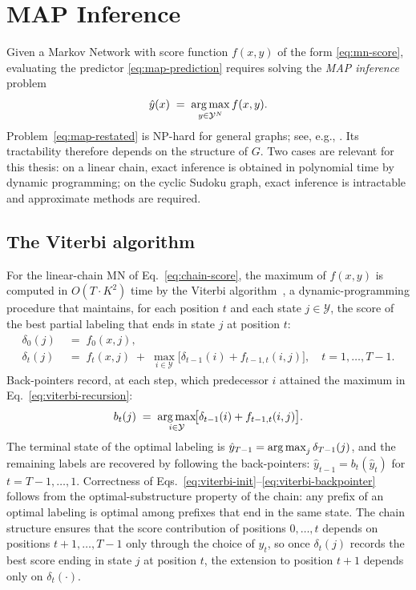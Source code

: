 \section{MAP Inference}
\label{sec:map-inference}

Given a Markov Network with score function $f(x, y)$ of the form
\eqref{eq:mn-score}, evaluating the predictor
\eqref{eq:map-prediction} requires solving the \emph{MAP inference}
problem
\begin{equation}
    \hat{y}(x) \;=\; \operatorname*{arg\,max}_{y \in \mathcal{Y}^{N}} f(x, y).
    \label{eq:map-restated}
\end{equation}
Problem~\eqref{eq:map-restated} is NP-hard for general graphs; see,
e.g., \cite{Shimony1994}. Its tractability therefore depends on the
structure of $G$. Two cases are relevant for this thesis: on a linear
chain, exact inference is obtained in polynomial time by dynamic
programming; on the cyclic Sudoku graph, exact inference is
intractable and approximate methods are required.

\subsection{The Viterbi algorithm}
\label{subsec:viterbi}

For the linear-chain MN of Eq.~\eqref{eq:chain-score}, the maximum of
$f(x, y)$ is computed in $O(T \cdot K^2)$ time by the Viterbi
algorithm~\cite{Viterbi1967, Forney1973}, a dynamic-programming
procedure that maintains, for each position $t$ and each state
$j \in \mathcal{Y}$, the score of the best partial labeling that ends
in state $j$ at position $t$:
\begin{align}
    \delta_0(j) &\;=\; f_0(x, j),
    \label{eq:viterbi-init} \\
    \delta_t(j) &\;=\; f_t(x, j)
    \;+\; \max_{i \in \mathcal{Y}}\!\bigl[
        \delta_{t-1}(i) + f_{t-1, t}(i, j)
    \bigr], \quad t = 1, \ldots, T-1.
    \label{eq:viterbi-recursion}
\end{align}
Back-pointers record, at each step, which predecessor $i$ attained
the maximum in Eq.~\eqref{eq:viterbi-recursion}:
\begin{equation}
    b_t(j) \;=\; \operatorname*{arg\,max}_{i \in \mathcal{Y}}\!\bigl[
        \delta_{t-1}(i) + f_{t-1, t}(i, j)
    \bigr].
    \label{eq:viterbi-backpointer}
\end{equation}
The terminal state of the optimal labeling is
$\hat{y}_{T-1} = \operatorname*{arg\,max}_j \delta_{T-1}(j)$, and the remaining
labels are recovered by following the back-pointers:
$\hat{y}_{t-1} = b_t(\hat{y}_t)$ for $t = T-1, \ldots, 1$.
Correctness of Eqs.~\eqref{eq:viterbi-init}--\eqref{eq:viterbi-backpointer}
follows from the optimal-substructure property of the chain: any
prefix of an optimal labeling is optimal among prefixes that end in
the same state. The chain structure ensures that the score
contribution of positions $0, \ldots, t$ depends on positions
$t+1, \ldots, T-1$ only through the choice of $y_t$, so once
$\delta_t(j)$ records the best score ending in state $j$ at
position $t$, the extension to position $t+1$ depends only on
$\delta_t(\cdot)$.

